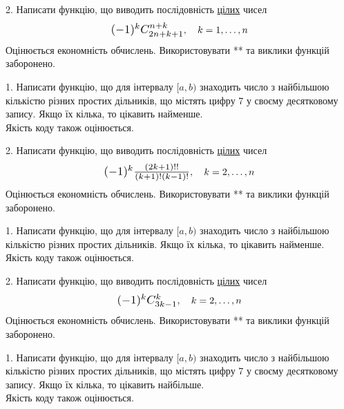 \documentclass[12pt, ukrainian]{article}
\begin{document}
\begin{Large}
\vspace{10mm}

\newpage

2. 
Написати функцію, що виводить послідовність \underline{цілих} чисел
$$\scalebox{1.2}{$(-1)^{k}C_{2n+k+1}^{n+k}$}, \quad k=1,\ldots,n$$
Оцінюється економність обчислень. Використовувати ** та виклики функцій заборонено.

\newpage




1. Написати функцію, що для інтервалу $[a, b)$ знаходить число з найбільшою кількістю різних простих дільників, що містять цифру 7 у своєму десятковому запису. Якщо їх кілька, то цікавить найменше.\\	Якість коду також оцінюється. 



\vspace{10mm}

\newpage

2. 
Написати функцію, що виводить послідовність \underline{цілих} чисел
$$\scalebox{1.2}{$(-1)^{k}\frac{(2k+1)!!}{(k+1)!(k-1)!}$}, \quad k=2,\ldots,n$$
Оцінюється економність обчислень. Використовувати ** та виклики функцій заборонено.

\newpage




1. Написати функцію, що для інтервалу $[a, b)$ знаходить число з найбільшою кількістю різних простих дільників. Якщо їх кілька, то цікавить найменше.\\	Якість коду також оцінюється. 



\vspace{10mm}

\newpage

2. 
Написати функцію, що виводить послідовність \underline{цілих} чисел
$$\scalebox{1.2}{$(-1)^{k}C_{3k-1}^{k}$}, \quad k=2,\ldots,n$$
Оцінюється економність обчислень. Використовувати ** та виклики функцій заборонено.

\newpage




1. Написати функцію, що для інтервалу $[a, b)$ знаходить число з найбільшою кількістю різних простих дільників, що містять цифру 7 у своєму десятковому запису. Якщо їх кілька, то цікавить найбільше.\\	Якість коду також оцінюється. 




\end{Large}
\end{document}
